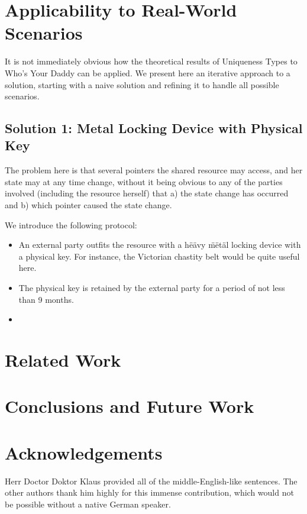 \documentclass[10pt,twocolumn,letterpaper]{article}
\begin{document}
\section{Applicability to Real-World Scenarios}
It is not immediately obvious how the theoretical results of Uniqueness Types to Who's Your Daddy can be applied. We present here an iterative approach to a solution, starting with a naive solution and refining it to handle all possible scenarios.

\subsection{Solution 1: Metal Locking Device with Physical Key}
The problem here is that several pointers the shared resource may access, and her state may at any time change, without it being obvious to any of the parties involved (including the resource herself) that a) the state change has occurred and b) which pointer caused the state change.

We introduce the following protocol:
\begin{itemize}
\item An external party outfits the resource with a h\"{e}\"{a}vy \"{m}\"{e}t\"{a}l locking device with a physical key. For instance, the Victorian chastity belt would be quite useful here.
\item The physical key is retained by the external party for a period of not less than 9 months.
\item
\end{itemize}


\section{Related Work}

\section{Conclusions and Future Work}
\section{Acknowledgements}
Herr Doctor Doktor Klaus provided all of the middle-English-like sentences. The other authors thank him highly for this immense contribution, which would not be possible without a native German speaker.
\end{document}
